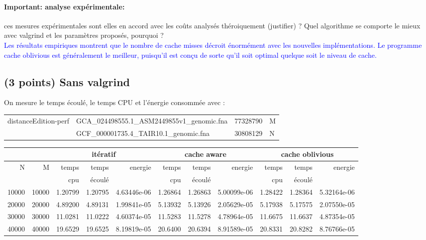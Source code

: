 \documentclass[10pt,a4paper]{article}
\begin{document}
\paragraph{Important: analyse expérimentale:} 
ces mesures expérimentales sont elles en accord avec les coûts analysés théroiquement (justifier) ?
Quel algorithme se comporte le mieux avec valgrind et 
les paramètres proposés, pourquoi ? \\
\textcolor{blue}{
Les résultats empiriques montrent que le nombre de cache misses décroit énormément avec les nouvelles implémentations. Le programme cache oblivious est généralement le meilleur, puisqu'il est conçu de sorte qu'il soit optimal quelque soit le niveau de cache.
}

\subsection{(3 points) Sans valgrind}
On mesure le temps écoulé, le temps CPU et l'énergie consommée avec : \\
{\tt \begin{tabular}{llll}
distanceEdition-perf  & GCA\_024498555.1\_ASM2449855v1\_genomic.fna & 77328790 & M \\
                      & GCF\_000001735.4\_TAIR10.1\_genomic.fna     & 30808129 & N
\end{tabular}}

\begin{tabular}{|r|r||r|r|r||r|r|r||r|r|r||}
\hline
 \multicolumn{2}{|c||}{ } 
& \multicolumn{3}{c||}{itératif}
& \multicolumn{3}{c||}{cache aware}
& \multicolumn{3}{c||}{cache oblivious}
\\ \hline
N & M 
& temps   & temps & energie       %
& temps   & temps & energie       %
& temps   & temps & energie       %
\\
& 
& cpu     & écoulé&               %
& cpu     & écoulé&               %
& cpu     & écoulé&               %
\\ \hline
\hline
10000 & 10000 
& 1.20799 & 1.20795 & 4.63446e-06 %
& 1.26864 & 1.26863 & 5.00099e-06 %
& 1.28422 & 1.28364 & 5.32164e-06 %
\\ \hline
20000 & 20000 
& 4.89200 & 4.89131 & 1.99841e-05 %
& 5.13932 & 5.13926 & 2.05629e-05 %
& 5.17938 & 5.17575 & 2.07550e-05 %
\\ \hline
30000 & 30000 
& 11.0281 & 11.0222 & 4.60374e-05 %
& 11.5283 & 11.5278 & 4.78964e-05 %
& 11.6675 & 11.6637 & 4.87354e-05 %
\\ \hline
40000 & 40000 
& 19.6529 & 19.6525 & 8.19819e-05 %
& 20.6400 & 20.6394 & 8.91589e-05 %
& 20.8331 & 20.8282 & 8.76766e-05 %
\\ \hline
\hline
\end{tabular}
\end{document}
